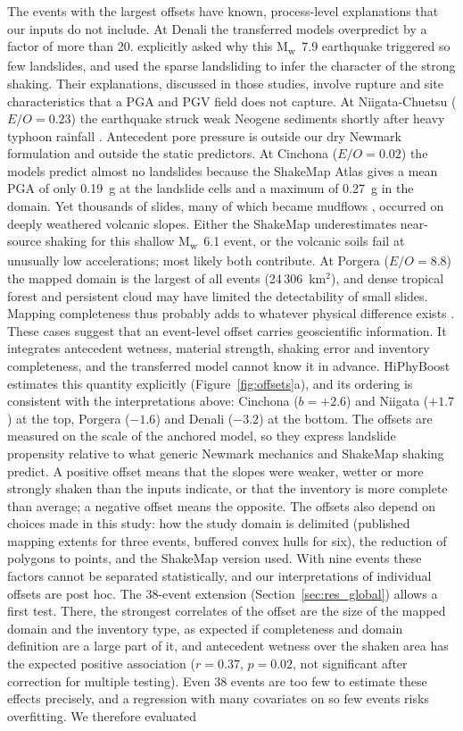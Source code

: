 The events with the largest offsets have known, process-level explanations that our inputs do not include. At Denali the transferred models overpredict by a factor of more than 20. \citet{gorum2014denali} explicitly asked why this M\textsubscript{w}~7.9 earthquake triggered so few landslides, and \citet{jibson2004} used the sparse landsliding to infer the character of the strong shaking. Their explanations, discussed in those studies, involve rupture and site characteristics that a PGA and PGV field does not capture. At Niigata-Chuetsu ($E/O=0.23$) the earthquake struck weak Neogene sediments shortly after heavy typhoon rainfall \citep{sassa2005}. Antecedent pore pressure is outside our dry Newmark formulation and outside the static predictors. At Cinchona ($E/O=0.02$) the models predict almost no landslides because the ShakeMap Atlas gives a mean PGA of only 0.19~g at the landslide cells and a maximum of 0.27~g in the domain. Yet thousands of slides, many of which became mudflows \citep{alvarado2009}, occurred on deeply weathered volcanic slopes. Either the ShakeMap underestimates near-source shaking for this shallow M\textsubscript{w}~6.1 event, or the volcanic soils fail at unusually low accelerations; most likely both contribute. At Porgera ($E/O=8.8$) the mapped domain is the largest of all events (24\,306~km$^2$), and dense tropical forest and persistent cloud may have limited the detectability of small slides. Mapping completeness thus probably adds to whatever physical difference exists \citep{tanyas2017,tanyas2022png}. These cases suggest that an event-level offset carries geoscientific information. It integrates antecedent wetness, material strength, shaking error and inventory completeness, and the transferred model cannot know it in advance. HiPhyBoost estimates this quantity explicitly (Figure~\ref{fig:offsets}a), and its ordering is consistent with the interpretations above: Cinchona ($b=+2.6$) and Niigata ($+1.7$) at the top, Porgera ($-1.6$) and Denali ($-3.2$) at the bottom. The offsets are measured on the scale of the anchored model, so they express landslide propensity relative to what generic Newmark mechanics and ShakeMap shaking predict. A positive offset means that the slopes were weaker, wetter or more strongly shaken than the inputs indicate, or that the inventory is more complete than average; a negative offset means the opposite. The offsets also depend on choices made in this study: how the study domain is delimited (published mapping extents for three events, buffered convex hulls for six), the reduction of polygons to points, and the ShakeMap version used. With nine events these factors cannot be separated statistically, and our interpretations of individual offsets are post hoc. The 38-event extension (Section~\ref{sec:res_global}) allows a first test. There, the strongest correlates of the offset are the size of the mapped domain and the inventory type, as expected if completeness and domain definition are a large part of it, and antecedent wetness over the shaken area has the expected positive association ($r=0.37$, $p=0.02$, not significant after correction for multiple testing). Even 38 events are too few to estimate these effects precisely, and a regression with many covariates on so few events risks overfitting. We therefore evaluated 